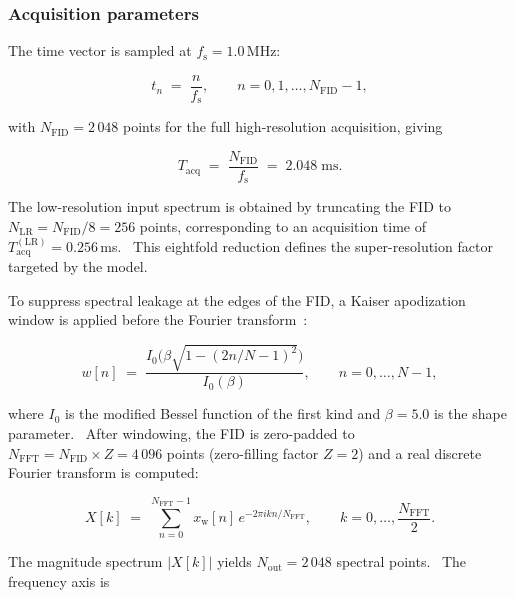 \documentclass[12pt,a4paper]{report}
\begin{document}
\subsubsection{Acquisition parameters}
The time vector is sampled at $f_{\mathrm{s}} = 1.0\,$MHz:

\begin{equation}
t_n \;=\; \frac{n}{f_{\mathrm{s}}}, \qquad
n = 0, 1, \dots, N_{\mathrm{FID}}-1,
\end{equation}

with $N_{\mathrm{FID}} = 2\,048$ points for the full high-resolution
acquisition, giving

\begin{equation}
T_{\mathrm{acq}} \;=\; \frac{N_{\mathrm{FID}}}{f_{\mathrm{s}}}
\;=\; 2.048\;\mathrm{ms}.
\end{equation}

The low-resolution input spectrum is obtained by truncating the FID to
$N_{\mathrm{LR}} = N_{\mathrm{FID}} / 8 = 256$ points, corresponding to an
acquisition time of $T_{\mathrm{acq}}^{\mathrm{(LR)}} = 0.256\,$ms.  This
eightfold reduction defines the super-resolution factor targeted by the model.

To suppress spectral leakage at the edges of the FID, a Kaiser apodization
window is applied before the Fourier transform~\cite{kaiser1966,harris1978}:

\begin{equation}
w[n] \;=\; \frac{I_0\!\bigl(\beta\sqrt{1-(2n/N-1)^2}\bigr)}
               {I_0(\beta)}, \qquad
n = 0,\dots,N-1,
\label{eq:kaiser_window}
\end{equation}

where $I_0$ is the modified Bessel function of the first kind and $\beta = 5.0$
is the shape parameter.  After windowing, the FID is zero-padded to
$N_{\mathrm{FFT}} = N_{\mathrm{FID}} \times Z = 4\,096$ points (zero-filling
factor $Z = 2$) and a real discrete Fourier transform is computed:

\begin{equation}
X[k] \;=\; \sum_{n=0}^{N_{\mathrm{FFT}}-1}
x_{\mathrm{w}}[n]\,e^{-2\pi i kn/N_{\mathrm{FFT}}},
\qquad
k = 0,\dots,\frac{N_{\mathrm{FFT}}}{2}.
\label{eq:fft}
\end{equation}

The magnitude spectrum $|X[k]|$ yields $N_{\mathrm{out}} = 2\,048$ spectral
points.  The frequency axis is
\end{document}
